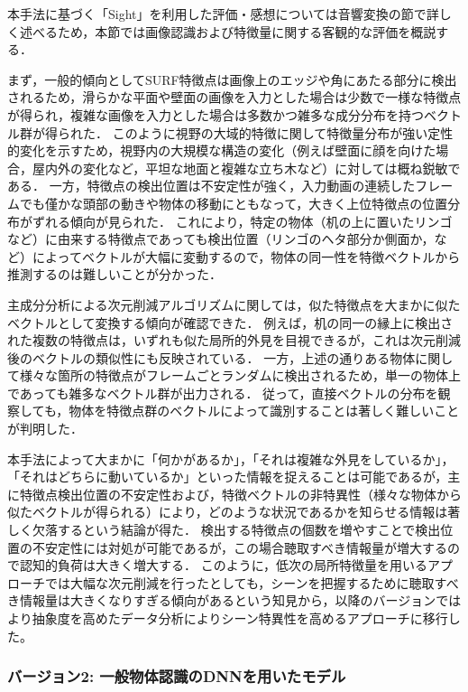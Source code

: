 本手法に基づく「Sight」を利用した評価・感想については音響変換の節で詳しく述べるため，本節では画像認識および特徴量に関する客観的な評価を概説する．

まず，一般的傾向としてSURF特徴点は画像上のエッジや角にあたる部分に検出されるため，滑らかな平面や壁面の画像を入力とした場合は少数で一様な特徴点が得られ，複雑な画像を入力とした場合は多数かつ雑多な成分分布を持つベクトル群が得られた．
このように視野の大域的特徴に関して特徴量分布が強い定性的変化を示すため，視野内の大規模な構造の変化（例えば壁面に顔を向けた場合，屋内外の変化など，平坦な地面と複雑な立ち木など）に対しては概ね鋭敏である．
一方，特徴点の検出位置は不安定性が強く，入力動画の連続したフレームでも僅かな頭部の動きや物体の移動にともなって，大きく上位特徴点の位置分布がずれる傾向が見られた．
これにより，特定の物体（机の上に置いたリンゴなど）に由来する特徴点であっても検出位置（リンゴのヘタ部分か側面か，など）によってベクトルが大幅に変動するので，物体の同一性を特徴ベクトルから推測するのは難しいことが分かった．

主成分分析による次元削減アルゴリズムに関しては，似た特徴点を大まかに似たベクトルとして変換する傾向が確認できた．
例えば，机の同一の縁上に検出された複数の特徴点は，いずれも似た局所的外見を目視できるが，これは次元削減後のベクトルの類似性にも反映されている．
一方，上述の通りある物体に関して様々な箇所の特徴点がフレームごとランダムに検出されるため，単一の物体上であっても雑多なベクトル群が出力される．
従って，直接ベクトルの分布を観察しても，物体を特徴点群のベクトルによって識別することは著しく難しいことが判明した．

本手法によって大まかに「何かがあるか」，「それは複雑な外見をしているか」，「それはどちらに動いているか」といった情報を捉えることは可能であるが，主に特徴点検出位置の不安定性および，特徴ベクトルの非特異性（様々な物体から似たベクトルが得られる）により，どのような状況であるかを知らせる情報は著しく欠落するという結論が得た．
検出する特徴点の個数を増やすことで検出位置の不安定性には対処が可能であるが，この場合聴取すべき情報量が増大するので認知的負荷は大きく増大する．
このように，低次の局所特徴量を用いるアプローチでは大幅な次元削減を行ったとしても，シーンを把握するために聴取すべき情報量は大きくなりすぎる傾向があるという知見から，以降のバージョンではより抽象度を高めたデータ分析によりシーン特異性を高めるアプローチに移行した。

\newpage
\subsubsection{バージョン2: 一般物体認識のDNNを用いたモデル}

